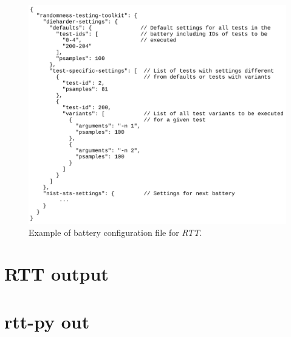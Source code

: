 \documentclass[
  digital,     %
  oneside,     %
  nosansbold,  %
  nocolorbold, %
  nolof,         %
  nolot,         %
]{fithesis4}
\begin{document}
\begin{figure}[H]
  \begin{center}
    \includegraphics[width=12.5cm]{figures/rtt/config.jpg}
  \end{center}
  \caption{Example of battery configuration file for \emph{RTT}.}
  \label{fig:rtt_config}
\end{figure}



\chapter{RTT output} \label{append:rtt-output}


\chapter{rtt-py out} \label{append:rtt-py-output}
\end{document}
